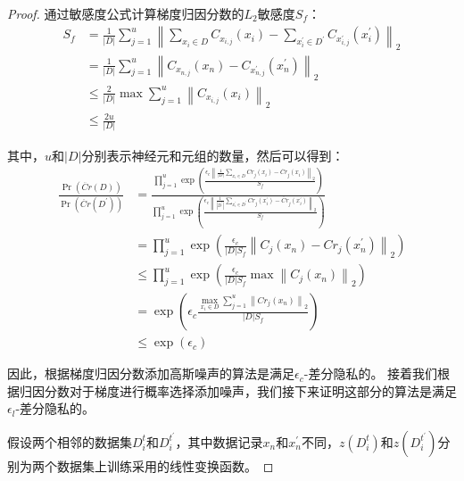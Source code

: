 \begin{proof}
通过敏感度公式计算梯度归因分数的$L_{2}$敏感度$S_{f}$：
\begin{equation}\label{eq:贡献敏感度}
\begin{aligned}
S_{f} &=\frac{1}{|D|} \sum_{j=1}^{u}\left\|\sum_{x_{i} \in D} C_{x_{i, j}}\left(x_{i}\right)-\sum_{x_{i}^{\prime} \in D^{\prime}} C_{x_{i, j}^{\prime}}\left(x_{i}^{\prime}\right)\right\|_{2} \\ &=\frac{1}{|D|} \sum_{j=1}^{u}\left\|C_{x_{n, j}}\left(x_{n}\right)-C_{x_{n, j}^{\prime}}\left(x_{n}^{\prime}\right)\right\|_{2} \\ & \leq \frac{2}{|D|} \max \sum_{j=1}^{u}\left\|C_{x_{i, j}}\left(x_{i}\right)\right\|_{2} \\ & \leq \frac{2 u}{|D|} 
\end{aligned}
\end{equation}

其中，$u$和$|D|$分别表示神经元和元组的数量，然后可以得到：
\begin{equation}\label{贡献数量和元组}
\begin{aligned}
\frac{\operatorname{Pr}(\ddot{Cr}(D))}{\operatorname{Pr}\left(\ddot{Cr}\left(D^{\prime}\right)\right)} &=\frac{\prod_{j=1}^{u} \exp \left(\frac{\epsilon_{c}\left\|\frac{1}{|D|} \sum_{x_{i} \in D} Cr_{j}\left(x_{i}\right)-\ddot{Cr}_{j}\left(x_{i}\right)\right\|_{2}}{S_{f}}\right)}{\prod_{j=1}^{u} \exp \left(\frac{\epsilon_{c}\left\|\frac{1}{\left|D^{\prime}\right|} \sum_{x_{i}^{\prime} \in D^{\prime}} Cr_{j}\left(x_{i}^{\prime}\right)-\ddot{Cr}_{j}\left(x_{i}^{\prime}\right)\right\|_{2}}{S_{f}}\right)} \\
&=\prod_{j=1}^{u} \exp \left(\frac{\epsilon_{c}}{|D| S_{f}}\left\|C_{j}\left(x_{n}\right)-Cr_{j}\left(x_{n}^{\prime}\right)\right\|_{2}\right) \\
& \leq \prod_{j=1}^{u} \exp \left(\frac{\epsilon_{c}}{|D| S_{f}} \max \left\|C_{j}\left(x_{n}\right)\right\|_{2}\right) \\
&=\exp \left(\epsilon_{c} \frac{\max _{x_{i} \in D} \sum_{j=1}^{u}\left\|Cr_{j}\left(x_{n}\right)\right\|_{2}}{|D| S_{f}}\right) \\
& \leq \exp \left(\epsilon_{c}\right)
\end{aligned}
\end{equation}

因此，根据梯度归因分数添加高斯噪声的算法是满足$\epsilon_{c}$-差分隐私的。
接着我们根据归因分数对于梯度进行概率选择添加噪声，我们接下来证明这部分的算法是满足$\epsilon_{l}$-差分隐私的。

假设两个相邻的数据集$D_{i}^{t}$和$D_{i}^{t^{\prime}}$，其中数据记录$x_{n}$和$x_{n}^{\prime}$不同，$z\left(D_{i}^{t}\right)$和$z\left(D_{i}^{t^{\prime}}\right)$分别为两个数据集上训练采用的线性变换函数。


\end{proof}
